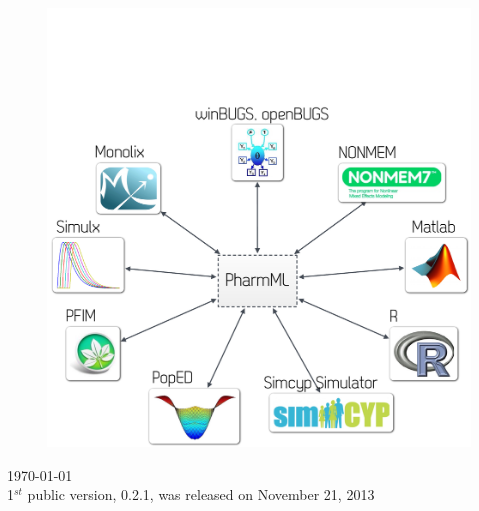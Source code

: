 \begin{titlepage}
\begin{center}
%
%
\begin{figure}[htb]
\centering
  \includegraphics[width=0.60\linewidth]{pics/coverFigure}
\end{figure}


\vfill

{\large \today \\}
{1$^{st}$ public version, 0.2.1, was released on November 21, 2013}

\end{center}
\end{titlepage}